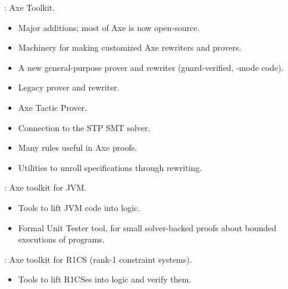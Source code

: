 
\begin{frame}

\implibtitle

:
Axe Toolkit.
\begin{itemize}
\item Major additions; most of Axe is now open-source.
\item Machinery for making customized Axe rewriters and provers.
\item A new general-purpose prover and rewriter
      (guard-verified, -mode code).
\item Legacy prover and rewriter.
\item Axe Tactic Prover.
\item Connection to the STP SMT solver.
\item Many rules useful in Axe proofs.
\item Utilities to unroll specifications through rewriting.
\end{itemize}

\end{frame}


\begin{frame}

\implibtitle

:
Axe toolkit for JVM.
\begin{itemize}
\item Tools to lift JVM code into logic.
\item Formal Unit Tester tool, for small solver-backed proofs about
bounded executions of programs.
\end{itemize}

\end{frame}


\begin{frame}

\implibtitle

:
Axe toolkit for R1CS (rank-1 constraint systems).
\begin{itemize}
\item Tools to lift R1CSes into logic and verify them.
\end{itemize}

\end{frame}

